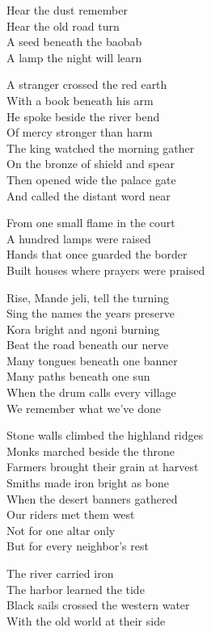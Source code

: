 \begin{lyrics}
Hear the dust remember\\
Hear the old road turn\\
A seed beneath the baobab\\
A lamp the night will learn

A stranger crossed the red earth\\
With a book beneath his arm\\
He spoke beside the river bend\\
Of mercy stronger than harm\\
The king watched the morning gather\\
On the bronze of shield and spear\\
Then opened wide the palace gate\\
And called the distant word near

From one small flame in the court\\
A hundred lamps were raised\\
Hands that once guarded the border\\
Built houses where prayers were praised

Rise, Mande jeli, tell the turning\\
Sing the names the years preserve\\
Kora bright and ngoni burning\\
Beat the road beneath our nerve\\
Many tongues beneath one banner\\
Many paths beneath one sun\\
When the drum calls every village\\
We remember what we’ve done

Stone walls climbed the highland ridges\\
Monks marched beside the throne\\
Farmers brought their grain at harvest\\
Smiths made iron bright as bone\\
When the desert banners gathered\\
Our riders met them west\\
Not for one altar only\\
But for every neighbor’s rest

The river carried iron\\
The harbor learned the tide\\
Black sails crossed the western water\\
With the old world at their side


\end{lyrics}
